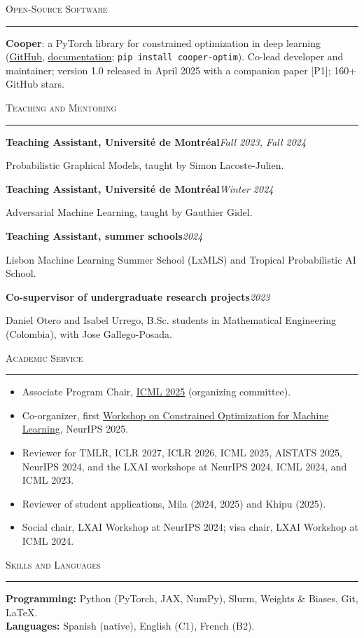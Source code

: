 \documentclass[11pt,letterpaper]{article}
\newcommand{\entry}[3]{%
  \par\addvspace{0.45em}%
  {\noindent\textbf{#1}\hfill\textit{#2}\par}%
  \nobreak\addvspace{0.1em}%
  {\noindent #3\par}%
}
\newcommand{\cvsection}[1]{%
  \par\addvspace{1.1em}%
  \Needspace{4\baselineskip}%
  {\noindent\large\scshape #1\par}%
  \nobreak\vspace{-0.55em}%
  {\noindent\color{rulegray}\rule{\textwidth}{0.4pt}\par}%
  \nobreak\addvspace{0.45em}%
}
\begin{document}
\cvsection{Open-Source Software}

\textbf{Cooper}: a PyTorch library for constrained optimization in deep learning
(\href{https://github.com/cooper-org/cooper}{GitHub}, \href{https://cooper.readthedocs.io}{documentation}; \texttt{pip install cooper-optim}).
Co-lead developer and maintainer; version 1.0 released in April 2025 with a companion paper [P1]; 160+ GitHub stars.

\cvsection{Teaching and Mentoring}

\entry{Teaching Assistant, Université de Montréal}{Fall 2023, Fall 2024}{Probabilistic Graphical Models, taught by Simon Lacoste-Julien.}

\entry{Teaching Assistant, Université de Montréal}{Winter 2024}{Adversarial Machine Learning, taught by Gauthier Gidel.}

\entry{Teaching Assistant, summer schools}{2024}{Lisbon Machine Learning Summer School (LxMLS) and Tropical Probabilistic AI School.}

\entry{Co-supervisor of undergraduate research projects}{2023}{Daniel Otero and Isabel Urrego, B.Sc. students in Mathematical Engineering (Colombia), with Jose Gallego-Posada.}

\cvsection{Academic Service}

\begin{itemize}
  \item Associate Program Chair, \href{https://icml.cc/Conferences/2025/Committees}{ICML 2025} (organizing committee).
  \item Co-organizer, first \href{https://constrained-opt-ml.github.io}{Workshop on Constrained Optimization for Machine Learning}, NeurIPS 2025.
  \item Reviewer for TMLR, ICLR 2027, ICLR 2026, ICML 2025, AISTATS 2025, NeurIPS 2024, and the LXAI workshops at NeurIPS 2024, ICML 2024, and ICML 2023.
  \item Reviewer of student applications, Mila (2024, 2025) and Khipu (2025).
  \item Social chair, LXAI Workshop at NeurIPS 2024; visa chair, LXAI Workshop at ICML 2024.
\end{itemize}

\cvsection{Skills and Languages}

\textbf{Programming:} Python (PyTorch, JAX, NumPy), Slurm, Weights \& Biases, Git, \LaTeX.\\
\textbf{Languages:} Spanish (native), English (C1), French (B2).
\end{document}
